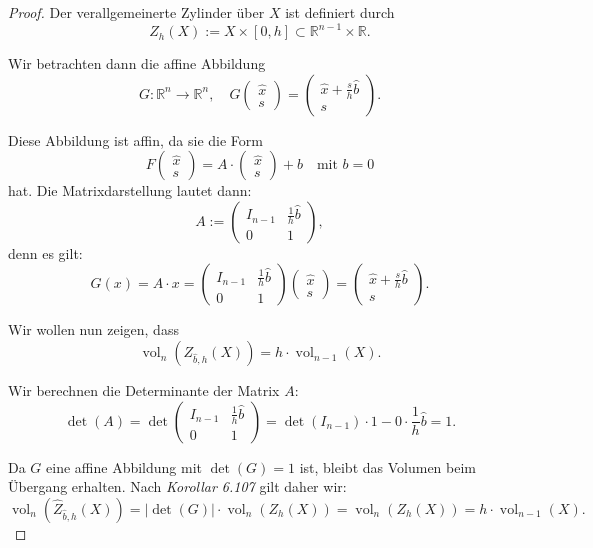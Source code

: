 \documentclass{article}
\begin{document}
\begin{proof}
  Der verallgemeinerte Zylinder über \( X \) ist definiert durch
  \[
  Z_h(X) := X \times [0, h] \subset \mathbb{R}^{n-1} \times \mathbb{R}.
  \]
  
  Wir betrachten dann die affine Abbildung
  \[
  G : \mathbb{R}^n \rightarrow \mathbb{R}^n, \quad G \begin{pmatrix} \hat{x} \\ s \end{pmatrix} = \begin{pmatrix} \hat{x} + \frac{s}{h} \hat{b} \\ s \end{pmatrix}.
  \]
  
  Diese Abbildung ist affin, da sie die Form
  \[
  F \begin{pmatrix} \hat{x} \\ s \end{pmatrix} = A \cdot \begin{pmatrix} \hat{x} \\ s \end{pmatrix} + b
  \quad \text{mit } b = 0
  \]
  hat.
  Die Matrixdarstellung lautet dann:
  \[
  A := \begin{pmatrix} 
  I_{n-1} & \frac{1}{h} \hat{b} \\
  0 & 1 
  \end{pmatrix},
  \]
  denn es gilt:
  \[
  G(x) = A \cdot x = 
  \begin{pmatrix} 
  I_{n-1} & \frac{1}{h} \hat{b} \\
  0 & 1 
  \end{pmatrix}
  \begin{pmatrix} \hat{x} \\ s \end{pmatrix} = 
  \begin{pmatrix} \hat{x} + \frac{s}{h} \hat{b} \\ s \end{pmatrix}.
  \]
  
  Wir wollen nun zeigen, dass
  \[
  \operatorname{vol}_n \left( Z_{\hat{b}, h}(X) \right) = h \cdot \operatorname{vol}_{n-1}(X).
  \]
  
  Wir berechnen die Determinante der Matrix \( A \):
  \[
  \det(A) = \det \begin{pmatrix} I_{n-1} & \frac{1}{h} \hat{b} \\ 0 & 1 \end{pmatrix} 
  = \det(I_{n-1}) \cdot 1 - 0 \cdot \frac{1}{h} \hat{b} = 1.
  \]
  
  Da \( G \) eine affine Abbildung mit \( \det(G) = 1 \) ist, bleibt das Volumen beim Übergang erhalten.
  Nach \textit{Korollar 6.107} gilt daher wir:
  \[
  \operatorname{vol}_n \left( \hat{Z}_{\hat{b}, h}(X) \right) = |\det(G)| \cdot \operatorname{vol}_n \left( Z_h(X) \right)
  =  \operatorname{vol}_n \left( Z_h(X) \right) = h \cdot \operatorname{vol}_{n-1}(X).
  \]
  
\end{proof}
\end{document}
